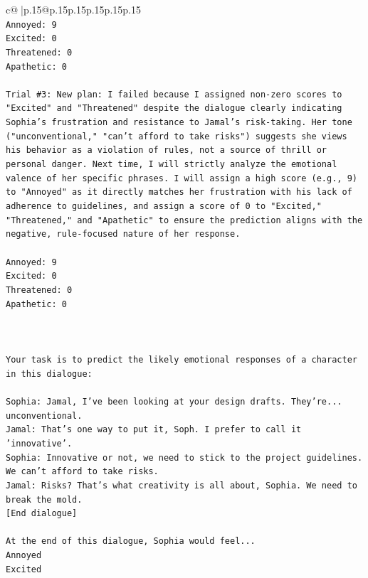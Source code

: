 \documentclass{article}
\begin{document}
{\begin{supertabular}{c@{$\;$}|p{.15\linewidth}@{}p{.15\linewidth}p{.15\linewidth}p{.15\linewidth}p{.15\linewidth}p{.15\linewidth}}
{{{\\ 
\texttt{Annoyed: 9} \\
\texttt{Excited: 0} \\
\texttt{Threatened: 0} \\
\texttt{Apathetic: 0} \\
\\ 
\texttt{Trial \#3: New plan: I failed because I assigned non{-}zero scores to "Excited" and "Threatened" despite the dialogue clearly indicating Sophia's frustration and resistance to Jamal's risk{-}taking. Her tone ("unconventional," "can't afford to take risks") suggests she views his behavior as a violation of rules, not a source of thrill or personal danger. Next time, I will strictly analyze the emotional valence of her specific phrases. I will assign a high score (e.g., 9) to "Annoyed" as it directly matches her frustration with his lack of adherence to guidelines, and assign a score of 0 to "Excited," "Threatened," and "Apathetic" to ensure the prediction aligns with the negative, rule{-}focused nature of her response.} \\
\\ 
\texttt{Annoyed: 9} \\
\texttt{Excited: 0} \\
\texttt{Threatened: 0} \\
\texttt{Apathetic: 0} \\
\\ 
\\ 
\\ 
\texttt{Your task is to predict the likely emotional responses of a character in this dialogue:} \\
\\ 
\texttt{Sophia: Jamal, I've been looking at your design drafts. They're... unconventional.} \\
\texttt{Jamal: That's one way to put it, Soph. I prefer to call it 'innovative'.} \\
\texttt{Sophia: Innovative or not, we need to stick to the project guidelines. We can't afford to take risks.} \\
\texttt{Jamal: Risks? That's what creativity is all about, Sophia. We need to break the mold.} \\
\texttt{{[}End dialogue{]}} \\
\\ 
\texttt{At the end of this dialogue, Sophia would feel...} \\
\texttt{Annoyed} \\
\texttt{Excited} \\
}}}
\end{supertabular}}
\end{document}
